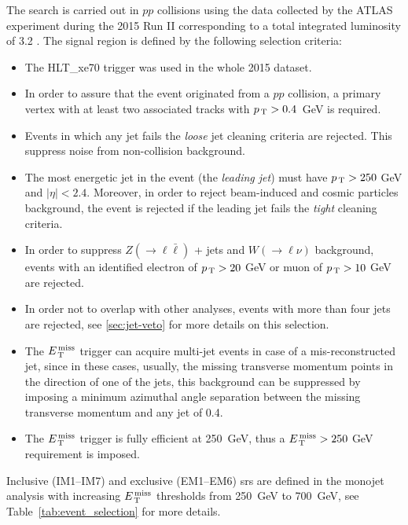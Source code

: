 The search is carried out in $pp$ collisions using the data collected by the
ATLAS experiment during the 2015 Run II corresponding to a total integrated
luminosity of 3.2 \ifb. The signal region is defined by the following selection
criteria:
\begin{itemize}
\item The HLT\_xe70 trigger was used in the whole 2015 dataset.
\item In order to assure that the event originated from a $pp$ collision, a
  primary vertex with at least two associated tracks with $p_\mathrm{\, T} > 0.4$~GeV is
  required.
\item Events in which any jet fails the \emph{loose} jet cleaning criteria are
  rejected. This suppress noise from non-collision background.
\item The most energetic jet in the event (the \emph{leading jet}) must have
  $p_\mathrm{\, T} > 250~$GeV and $|\eta| < 2.4$. Moreover, in order to reject beam-induced
  and cosmic particles background, the event is rejected if the leading jet
  fails the \emph{tight} cleaning criteria.
\item In order to suppress $Z (\rightarrow \ell \bar{\ell})$ + jets and
  $W (\rightarrow \ell \nu)$ background, events with an identified electron of
  $p_\mathrm{\, T} > 20~$GeV or muon of $p_\mathrm{\, T} > 10~$GeV are rejected.
\item In order not to overlap with other analyses, events with more than four
  jets are rejected, see \cref{sec:jet-veto} for more details on this selection.
\item The $E_\mathrm{\, T}^\mathrm{\, miss}$ trigger can acquire multi-jet events in case of a
  mis-reconstructed jet, since in these cases, usually, the missing transverse
  momentum points in the direction of one of the jets, this background can be
  suppressed by imposing a minimum azimuthal angle separation between the
  missing transverse momentum and any jet of 0.4.
\item The $E_\mathrm{\, T}^\mathrm{\, miss}$ trigger is fully efficient at 250~GeV, thus a $E_\mathrm{\, T}^\mathrm{\, miss} > 250~$GeV
  requirement is imposed.
\end{itemize}
Inclusive (IM1--IM7) and exclusive (EM1--EM6) \glspl{sr} are defined in the
monojet analysis with increasing $E_\mathrm{\, T}^\mathrm{\, miss}$ thresholds from 250~GeV to 700~GeV, see
Table~\ref{tab:event_selection} for more details.

